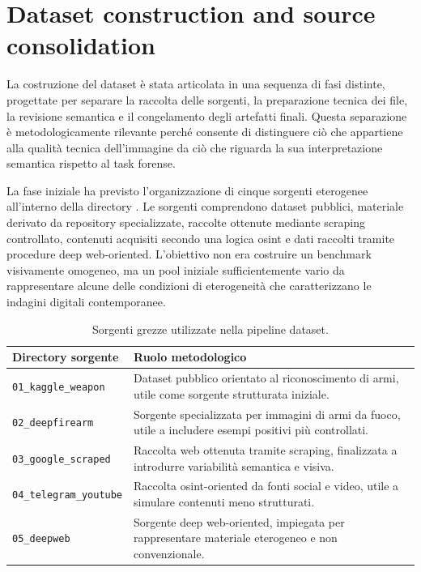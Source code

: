 \section{Dataset construction and source consolidation}
\label{sec:methodology-dataset-construction}

La costruzione del dataset è stata articolata in una sequenza di fasi distinte,
progettate per separare la raccolta delle sorgenti, la preparazione tecnica dei
file, la revisione semantica e il congelamento degli artefatti finali. Questa
separazione è metodologicamente rilevante perché consente di distinguere ciò
che appartiene alla qualità tecnica dell'immagine da ciò che riguarda la sua
interpretazione semantica rispetto al task forense.

La fase iniziale ha previsto l'organizzazione di cinque sorgenti eterogenee
all'interno della directory . Le sorgenti comprendono
dataset pubblici, materiale derivato da repository specializzate, raccolte
ottenute mediante scraping controllato, contenuti acquisiti secondo una logica
\gls{osint} e dati raccolti tramite procedure deep web-oriented. L'obiettivo non era
costruire un benchmark visivamente omogeneo, ma un pool iniziale sufficientemente
vario da rappresentare alcune delle condizioni di eterogeneità che caratterizzano
le indagini digitali contemporanee.


\begin{table}[H]
\centering
\caption{Sorgenti grezze utilizzate nella pipeline dataset.}
\label{tab:methodology-raw-sources}
\begin{tabularx}{\textwidth}{@{}lX@{}}
\toprule
\textbf{Directory sorgente} & \textbf{Ruolo metodologico} \\
\midrule
\texttt{01\_kaggle\_weapon}    & Dataset pubblico orientato al riconoscimento
                                 di armi, utile come sorgente strutturata
                                 iniziale. \\
\texttt{02\_deepfirearm}       & Sorgente specializzata per immagini di armi
                                 da fuoco, utile a includere esempi positivi
                                 più controllati. \\
\texttt{03\_google\_scraped}   & Raccolta web ottenuta tramite scraping,
                                 finalizzata a introdurre variabilità semantica
                                 e visiva. \\
\texttt{04\_telegram\_youtube} & Raccolta \gls{osint}-oriented da fonti social
                                 e video, utile a simulare contenuti meno
                                 strutturati. \\
\texttt{05\_deepweb}           & Sorgente deep web-oriented, impiegata per
                                 rappresentare materiale eterogeneo e non
                                 convenzionale. \\
\bottomrule
\end{tabularx}
\end{table}


